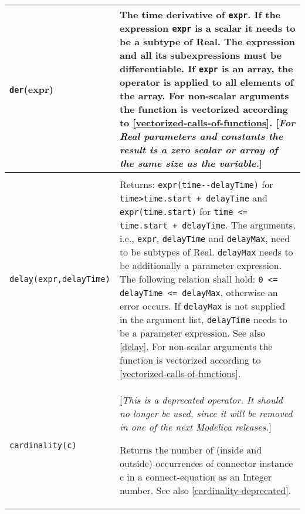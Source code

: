 \begin{longtable}{|p{5.1cm}|p{8cm}|} 
\hline \endhead

\lstinline[basicstyle=\ttfamily]!der!(expr) & 
The time derivative of \lstinline[basicstyle=\ttfamily]!expr!. If the expression \lstinline[basicstyle=\ttfamily]!expr! is a
scalar it needs to be a subtype of Real. The expression and all its
subexpressions must be differentiable. If \lstinline[basicstyle=\ttfamily]!expr! is an array, the operator
is applied to all elements of the array. For non-scalar arguments the
function is vectorized according to \autoref{vectorized-calls-of-functions}. {[}\emph{For Real
parameters and constants the result is a zero scalar or array of the
same size as the variable.}{]}\\ 
\hline

\begin{tabular}{@{}p{5.1cm}@{}}

\lstinline[basicstyle=\ttfamily]!delay(expr,delayTime,delayMax)!\\
\lstinline[basicstyle=\ttfamily]!delay(expr,delayTime)!
\end{tabular} & 
Returns: \lstinline[basicstyle=\ttfamily]!expr(time--delayTime)! for \lstinline[basicstyle=\ttfamily]!time>time.start + delayTime! and \lstinline[basicstyle=\ttfamily]!expr(time.start)! for \lstinline[basicstyle=\ttfamily]!time <= time.start + delayTime!. The arguments, i.e., \lstinline[basicstyle=\ttfamily]!expr!, \lstinline[basicstyle=\ttfamily]!delayTime! and \lstinline[basicstyle=\ttfamily]!delayMax!, need to be
subtypes of Real. \lstinline[basicstyle=\ttfamily]!delayMax! needs to be additionally a parameter
expression. The following relation shall hold: \lstinline[basicstyle=\ttfamily]!0 <= delayTime <= delayMax!, otherwise an error occurs. If \lstinline[basicstyle=\ttfamily]!delayMax! is not
supplied in the argument list, \lstinline[basicstyle=\ttfamily]!delayTime! needs to be a parameter
expression. See also \autoref{delay}. For non-scalar arguments the
function is vectorized according to \autoref{vectorized-calls-of-functions}.\\
\hline

\lstinline[basicstyle=\ttfamily]!cardinality(c)! & {[}\emph{This is a deprecated operator. It should no longer be used,
since it will be removed in one of the next Modelica releases.}{]}

Returns the number of (inside and outside) occurrences of connector
instance c in a connect-equation as an Integer number. See also \autoref{cardinality-deprecated}.\\ 
\hline


\end{longtable}
